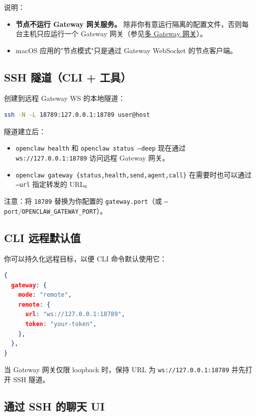 说明：

\begin{itemize}
  \item \textbf{节点不运行 Gateway 网关服务。} 除非你有意运行隔离的配置文件，否则每台主机只应运行一个 Gateway 网关（参见\href{/gateway/multiple-gateways}{多 Gateway 网关}）。
  \item macOS 应用的"节点模式"只是通过 Gateway WebSocket 的节点客户端。
\end{itemize}


\subsection{SSH 隧道（CLI + 工具）}


创建到远程 Gateway WS 的本地隧道：

\begin{lstlisting}[language=bash]
ssh -N -L 18789:127.0.0.1:18789 user@host
\end{lstlisting}


隧道建立后：

\begin{itemize}
  \item \texttt{openclaw health} 和 \texttt{openclaw status --deep} 现在通过 \texttt{ws://127.0.0.1:18789} 访问远程 Gateway 网关。
  \item \texttt{openclaw gateway \{status,health,send,agent,call\}} 在需要时也可以通过 \texttt{--url} 指定转发的 URL。
\end{itemize}


注意：将 \texttt{18789} 替换为你配置的 \texttt{gateway.port}（或 \texttt{--port}/\texttt{OPENCLAW\_GATEWAY\_PORT}）。

\subsection{CLI 远程默认值}


你可以持久化远程目标，以便 CLI 命令默认使用它：

\begin{lstlisting}[language=json]
{
  gateway: {
    mode: "remote",
    remote: {
      url: "ws://127.0.0.1:18789",
      token: "your-token",
    },
  },
}
\end{lstlisting}


当 Gateway 网关仅限 loopback 时，保持 URL 为 \texttt{ws://127.0.0.1:18789} 并先打开 SSH 隧道。

\subsection{通过 SSH 的聊天 UI}


